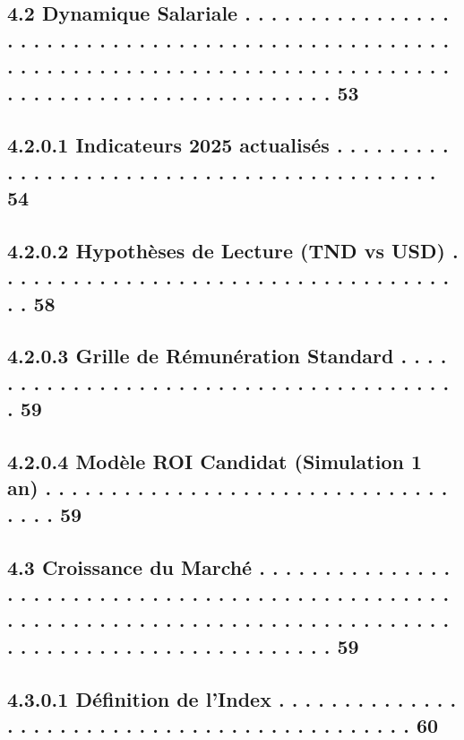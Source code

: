 \documentclass[12pt,landscape,a4paper]{article}
\begin{document}
\subsection{4.2     Dynamique Salariale . . . . . . . . . . . . . . . . . . . . . . . . . . . . . . . . . . . . . . . . . . . . . . . . . . . . . . . . . . . . . . . . . . . . . . . . . . . . . . . . . . . . . . . . . . . . . . . . . . . . . . . . . . . . . 53}
\subsection{4.2.0.1 Indicateurs 2025 actualisés . . . . . . . . . . . . . . . . . . . . . . . . . . . . . . . . . . . . . . . . . .                                                                                                                  54}
\subsection{4.2.0.2 Hypothèses de Lecture (TND vs USD) . . . . . . . . . . . . . . . . . . . . . . . . . . . . . . . . . . . . .                                                                                                                     58}
\subsection{4.2.0.3 Grille de Rémunération Standard . . . . . . . . . . . . . . . . . . . . . . . . . . . . . . . . . . . . . . .                                                                                                                    59}
\subsection{4.2.0.4 Modèle ROI Candidat (Simulation 1 an) . . . . . . . . . . . . . . . . . . . . . . . . . . . . . . . . . . .                                                                                                                      59}
\subsection{4.3     Croissance du Marché . . . . . . . . . . . . . . . . . . . . . . . . . . . . . . . . . . . . . . . . . . . . . . . . . . . . . . . . . . . . . . . . . . . . . . . . . . . . . . . . . . . . . . . . . . . . . . . . . . . . . . . . . . . . 59}
\subsection{4.3.0.1           Définition de l’Index . . . . . . . . . . . . . . . . . . . . . . . . . . . . . . . . . . . . . . . . . . . . .                                                                                                        60}
\end{document}
